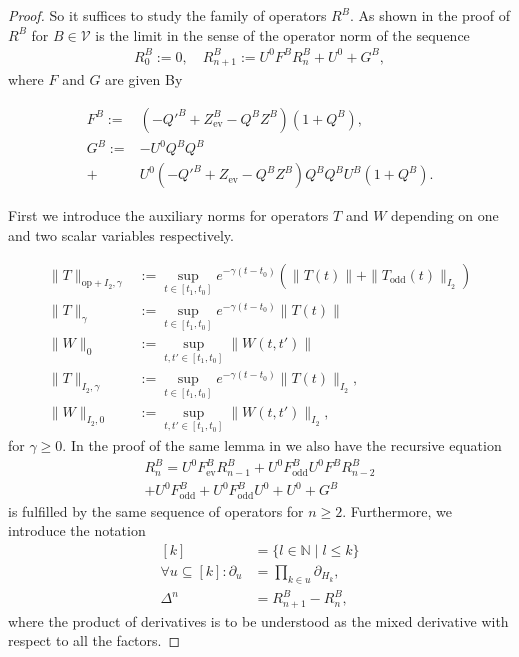 \documentclass[b5paper,draft,openbib,12pt]{memoir}
\DeclareMathOperator{\ev}{ev}
\DeclareMathOperator{\odd}{odd}
\begin{document}
\begin{proof}
So it suffices to study the family of operators \(R^B\). 
As shown in the proof of \cite[lemma 3.5]{ivp0}
\(R^B\) for \(B\in\mathcal{V}\) is the limit in the sense of the 
operator norm of the sequence
\begin{align}
R^B_{0}:=0, \quad R^B_{n+1}:=U^0 F^B R^B_{n}+ U^0 + G^B,
\end{align}
where \(F\) and \(G\) are given By

\begin{align}
F^B:=& (-{Q'}^B+Z^B_{\ev}-Q^BZ^B)(1+Q^B),\\
G^B:=&- U^0Q^BQ^B \\
+& U^0(-{Q'}^B+Z_{\ev}-Q^B Z^B)Q^B Q^B U^B (1+Q^B).
\end{align}

First we introduce the auxiliary norms for operators \(T\) 
and \(W\) depending on one and two 
scalar variables respectively.

\begin{align}
  \|T \|_{\mathrm{op}+I_2,\gamma}
  &:=\sup_{t\in[t_1,t_0]}e^{-\gamma (t-t_0)} \left(\|T(t)\|
  +\| T_{\odd}(t)\|_{I_2}\right)\\
  \|T \|_{\gamma}&:=\sup_{t\in[t_1,t_0]}e^{-\gamma (t-t_0)} \|T(t)\|\\
  \|W \|_{0}&:=\sup_{t,t'\in[t_1,t_0]} \|W(t,t')\|\\
  \|T \|_{I_2 ,\gamma}&:=\sup_{t\in[t_1,t_0]}e^{-\gamma (t-t_0)} \| T(t)\|_{I_2},\\
  \|W \|_{I_2 ,0}&:=\sup_{t,t'\in[t_1,t_0]} \| W(t,t')\|_{I_2},
\end{align}
for \(\gamma\ge 0 \).
In the proof of the same lemma in \cite[equation (3.42)]{ivp0}
we also have the recursive equation 
\begin{align}
R^B_{n}=U^0F^B_{\ev}R^B_{n-1}+U^0F^B_{\odd} U^0F^B R^B_{n-2}\\
+U^0 F^B_{\odd} +U^0F^B_{\odd} U^0 + U^0 +G^B
\end{align}
is fulfilled by the same sequence of operators for \(n\ge 2\).
Furthermore, we introduce the notation
\begin{align}\label{derivative set 1}
[k]&=\{l\in\mathbb{N}\mid l\le k\}\\\label{derivative set 2}
\forall u\subseteq [k]:\partial_{u}&=\prod_{k\in u}\partial_{H_k},\\
\Delta^n&=R^B_{n+1}-R^B_n,
\end{align}
where the product of derivatives is to be understood as the 
mixed derivative with respect to all the factors.


\end{proof}
\end{document}
